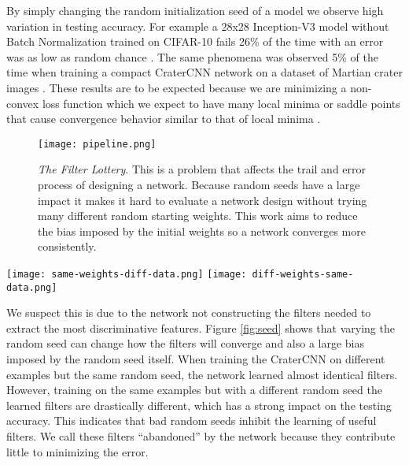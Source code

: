 \documentclass{article}
\begin{document}
By simply changing the random initialization seed of a model we observe high variation in testing accuracy.  For example a 28x28 Inception-V3 model without Batch Normalization trained on CIFAR-10 fails 26\% of the time with an error was as low as random chance \cite{szegedy_rethinking_2015,krizhevsky_learning_2009}. The same phenomena was observed 5\% of the time when training a compact CraterCNN network on a dataset of Martian crater images \cite{cohen_crater_2016,bandeira_automatic_2010,cohen_randomout:_2016}. These results are to be expected because we are minimizing a non-convex loss function which we expect to have many local minima or saddle points that cause convergence behavior similar to that of local minima \cite{dauphin_identifying_2014}. 

\begin{figure}
  \begin{center}
    \texttt{[image: pipeline.png]}
     \caption{\textit{The Filter Lottery}. This is a problem that affects the trail and error process of designing a network. Because random seeds have a large impact it makes it hard to evaluate a network design without trying many different random starting weights. This work aims to reduce the bias imposed by the initial weights so a network converges more consistently. 
     }
      \label{fig:pipeline}
  \end{center}
\end{figure}	


\begin{figure*}
  \begin{center}
    \texttt{[image: same-weights-diff-data.png]}%
    \texttt{[image: diff-weights-same-data.png]}
     \caption{When training the CraterCNN on different examples but using the same random seed the network learned almost identical filters.
     When we vary random seeds and train on the same data we find that the filters learned are drastically different.
     }
      \label{fig:seed}
  \end{center}
\end{figure*}

We suspect this is due to the network not constructing the filters needed to extract the most discriminative features. Figure \ref{fig:seed} shows that varying the random seed can change how the filters will converge and also a large bias imposed by the random seed itself. When training the CraterCNN on different examples but the same random seed, the network learned almost identical filters. However, training on the same examples but with a different random seed the learned filters are drastically different, which has a strong impact on the testing accuracy.  This indicates that bad random seeds inhibit the learning of useful filters.  We call these filters ``abandoned'' by the network because they contribute little to minimizing the error. 
\end{document}
